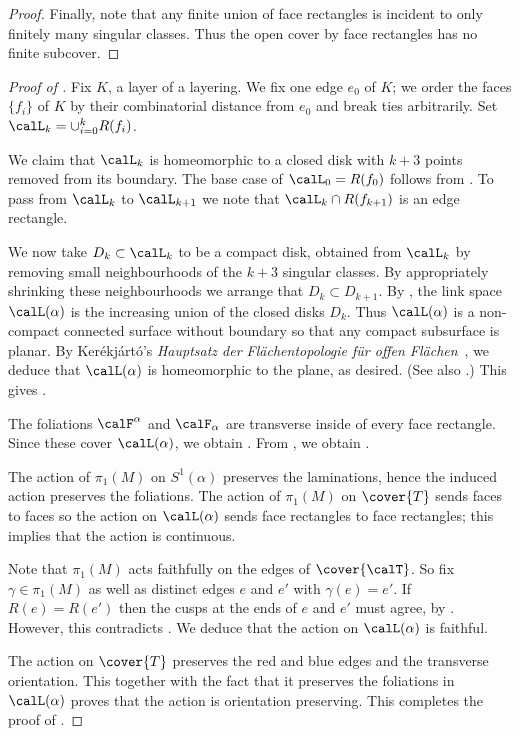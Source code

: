 \documentclass[12pt]{amsart}
\begin{document}
\begin{proof}
Finally, note that any finite union of face rectangles is incident to only finitely many singular classes.  Thus the open cover by face rectangles has no finite subcover. 
\end{proof}

\begin{proof}[Proof of ]
Fix $K$, a layer of a layering. We fix one edge $e_0$ of $K$; we order the faces $\{f_i\}$ of $K$ by their combinatorial distance from $e_0$ and break ties arbitrarily.  Set $\calL_k = \cup_{i = 0}^k R(f_i)$.  

We claim that $\calL_k$ is homeomorphic to a closed disk with $k + 3$ points removed from its boundary.  The base case of $\calL_0 = R(f_0)$ follows from .  To pass from $\calL_k$ to $\calL_{k+1}$ we note that $\calL_k \cap R(f_{k+1})$ is an edge rectangle.  

We now take $D_k \subset \calL_k$ to be a compact disk, obtained from $\calL_k$ by removing small neighbourhoods of the $k + 3$ singular classes.  By appropriately shrinking these neighbourhoods we arrange that $D_k \subset D_{k+1}$.  By , the link space $\calL(\alpha)$ is the increasing union of the closed disks $D_k$.  Thus $\calL(\alpha)$ is a non-compact connected surface without boundary so that any compact subsurface is planar.  By Ker\'ekj\'art\'o's \textit{Hauptsatz der Fl\"achentopologie f\"ur offen Fl\"achen}~\cite[page~170]{Kerekjarto23}, we deduce that $\calL(\alpha)$ is homeomorphic to the plane, as desired.  (See also \cite[Theorem~1]{Richards63}.)  This gives . 



The foliations $\calF^\alpha$ and $\calF_\alpha$ are transverse inside of every face rectangle.  Since these cover $\calL(\alpha)$, we obtain . From , we obtain .

The action of $\pi_1(M)$ on $S^1(\alpha)$ preserves the laminations, hence the induced action preserves the foliations.  The action of $\pi_1(M)$ on $\cover{T}$ sends faces to faces so the action on $\calL(\alpha)$ sends face rectangles to face rectangles; this implies that the action is continuous.  

Note that $\pi_1(M)$ acts faithfully on the edges of $\cover{\calT}$.  So fix $\gamma \in \pi_1(M)$ as well as distinct edges $e$ and $e'$ with $\gamma(e) = e'$.  If $R(e) = R(e')$ then the cusps at the ends of $e$ and $e'$ must agree, by .  However, this contradicts .  We deduce that the action on $\calL(\alpha)$ is faithful. 

The action on $\cover{T}$ preserves the red and blue edges and the transverse orientation.  This together with the fact that it preserves the foliations in $\calL(\alpha)$ proves that the action is orientation preserving.  
This completes the proof of .  
\end{proof}
\end{document}
